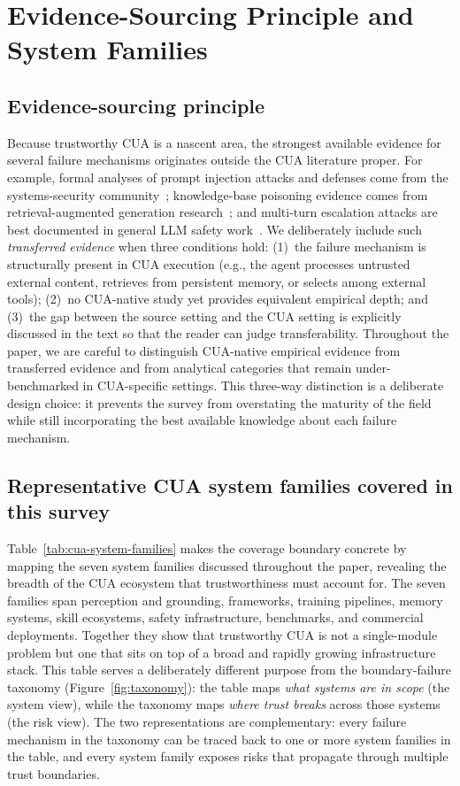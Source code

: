 \section{Evidence-Sourcing Principle and System Families}
\label{app:evidence-sourcing-families}

\subsection{Evidence-sourcing principle}
Because trustworthy CUA is a nascent area, the strongest available evidence for several failure mechanisms originates outside the CUA literature proper. For example, formal analyses of prompt injection attacks and defenses come from the systems-security community~\cite{liuyupei2024formalizing,struq2025,secalign2025}; knowledge-base poisoning evidence comes from retrieval-augmented generation research~\cite{poisonedrag2025}; and multi-turn escalation attacks are best documented in general LLM safety work~\cite{crescendo2025}. We deliberately include such \emph{transferred evidence} when three conditions hold: (1)~the failure mechanism is structurally present in CUA execution (e.g., the agent processes untrusted external content, retrieves from persistent memory, or selects among external tools); (2)~no CUA-native study yet provides equivalent empirical depth; and (3)~the gap between the source setting and the CUA setting is explicitly discussed in the text so that the reader can judge transferability. Throughout the paper, we are careful to distinguish CUA-native empirical evidence from transferred evidence and from analytical categories that remain under-benchmarked in CUA-specific settings. This three-way distinction is a deliberate design choice: it prevents the survey from overstating the maturity of the field while still incorporating the best available knowledge about each failure mechanism.

\subsection{Representative CUA system families covered in this survey}

Table~\ref{tab:cua-system-families} makes the coverage boundary concrete by mapping the seven system families discussed throughout the paper, revealing the breadth of the CUA ecosystem that trustworthiness must account for. The seven families span perception and grounding, frameworks, training pipelines, memory systems, skill ecosystems, safety infrastructure, benchmarks, and commercial deployments. Together they show that trustworthy CUA is not a single-module problem but one that sits on top of a broad and rapidly growing infrastructure stack. This table serves a deliberately different purpose from the boundary-failure taxonomy (Figure~\ref{fig:taxonomy}): the table maps \emph{what systems are in scope} (the system view), while the taxonomy maps \emph{where trust breaks} across those systems (the risk view). The two representations are complementary: every failure mechanism in the taxonomy can be traced back to one or more system families in the table, and every system family exposes risks that propagate through multiple trust boundaries.

